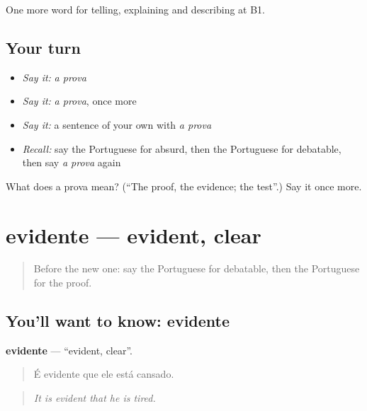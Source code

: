 \begin{grammarlens}[title={What you've built}]
One more word for telling, explaining and describing at B1.
\end{grammarlens}

\subsection*{Your turn}
\begin{itemize}
\raggedright
  \item \emph{Say it:} \emph{a prova}
  \item \emph{Say it:} \emph{a prova}, once more
  \item \emph{Say it:} a sentence of your own with \emph{a prova}
  \item \emph{Recall:} say the Portuguese for absurd, then the Portuguese for debatable, then say \emph{a prova} again
\end{itemize}

\begin{tcolorbox}[breakable,colback=teal!4,colframe=teal!35!black,title={Before you move on}]
What does a prova mean? (\textquotedblleft{}The proof, the evidence; the test\textquotedblright{}.) Say it once more.
\end{tcolorbox}
\section[evidente]{evidente — evident, clear}

\label{lesson:PT-C341-evidente}



\begin{quote}
Before the new one: say the Portuguese for debatable, then the Portuguese for the proof.
\end{quote}

\subsection*{You'll want to know: evidente}
\textbf{evidente} — \textquotedblleft{}evident, clear\textquotedblright{}.

\begin{quote}
É evidente que ele está cansado.
\end{quote}

\begin{quote}
\emph{It is evident that he is tired.}
\end{quote}


